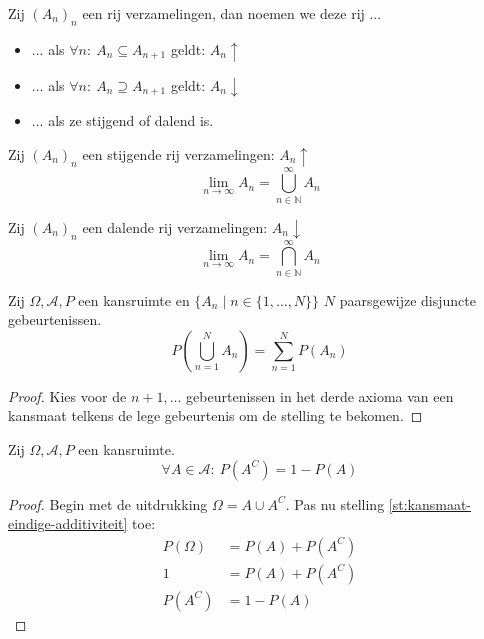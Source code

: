 \documentclass[main.tex]{subfiles}
\begin{document}
\begin{de}
  Zij $(A_{n})_{n}$ een rij verzamelingen, dan noemen we deze rij ...
  \begin{itemize}
  \item ...  als $\forall n:\ A_{n}\subseteq A_{n+1}$ geldt: $A_{n}\uparrow$
  \item ...  als $\forall n:\ A_{n}\supseteq A_{n+1}$ geldt: $A_{n}\downarrow$
  \item ...  als ze stijgend of dalend is.
  \end{itemize}
\end{de}

\begin{de}
  Zij $(A_{n})_{n}$ een stijgende rij verzamelingen: $A_{n} \uparrow$
  \[ \lim_{n\rightarrow \infty}A_{n} = \bigcup_{n\in \mathbb{N}}^{\infty}A_{n} \]
\end{de}

\begin{de}
  Zij $(A_{n})_{n}$ een dalende rij verzamelingen: $A_{n} \downarrow$
  \[ \lim_{n\rightarrow \infty}A_{n} = \bigcap_{n\in \mathbb{N}}^{\infty}A_{n} \]
\end{de}


\begin{st}
  \label{st:kansmaat-eindige-additiviteit}
  Zij $\Omega,\mathcal{A},P$ een kansruimte en $\{ A_{n} \mid n\in \{ 1,\dotsc,N\} \}$ $N$ paarsgewijze disjuncte gebeurtenissen.
  \[ P\left( \bigcup_{n=1}^{N}A_{n}\right) = \sum_{n=1}^{N}P(A_{n}) \]

  \begin{proof}
    Kies voor de $n+1,\dotsc$ gebeurtenissen in het derde axioma van een kansmaat telkens de lege gebeurtenis om de stelling te bekomen.
  \end{proof}
\end{st}

\begin{st}
  Zij $\Omega,\mathcal{A},P$ een kansruimte.
  \[ \forall A \in \mathcal{A}:\ P(A^{C}) = 1 - P(A) \]

  \begin{proof}
    Begin met de uitdrukking $\Omega = A \cup A^{C}$.
    Pas nu stelling \ref{st:kansmaat-eindige-additiviteit} toe:
    \[
    \begin{array}{rl}
      P(\Omega) &= P(A) + P(A^{C})\\
      1         &= P(A) + P(A^{C})\\
      P(A^{C})  &= 1-P(A)
    \end{array}
    \]
  \end{proof}
\end{st}
\end{document}

